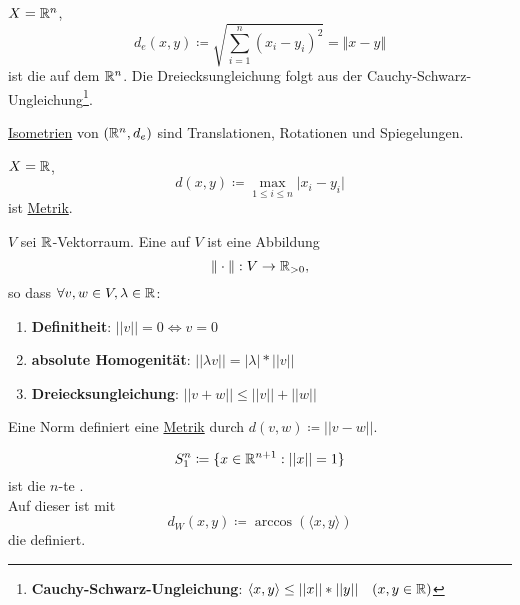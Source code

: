 \begin{example}
  \label{bsp:standardmetrik}
  $ X = \mathbb{R}^n $,
  \begin{equation*}
    d_e(x, y) \coloneqq \sqrt{\sum_{i=1}^n(x_i-y_i)^2} = \Vert x-y \Vert
  \end{equation*}
  ist die  auf dem $ \mathbb{R}^n $. Die Dreiecksungleichung folgt aus der Cauchy-Schwarz-Ungleichung\footnote{\textbf{Cauchy-Schwarz-Ungleichung}: $ \langle x, y \rangle \leq ||x||*||y|| \quad (x, y \in \mathbb{R}) $}.
\end{example}

\begin{remark}[aus LA II]
  \hyperref[def:isometrie]{Isometrien} von $ (\mathbb{R}^n, d_e) $ sind Translationen, Rotationen und Spiegelungen.
\end{remark}

\begin{example}[Maximumsmetrik]
  \label{bsp:maximumsmetrik}
  $ X = \mathbb{R} $,
  \begin{equation*}
    d(x, y) \coloneqq \underset{1 \leq i \leq n}{\max} \vert x_i-y_i \vert
  \end{equation*}
  ist \hyperref[def:metrik]{Metrik}.
\end{example}

\begin{example}
  \label{bsp:norm}
  $ V $ sei $ \mathbb{R} $-Vektorraum. Eine  auf $ V $ ist eine Abbildung 
  \begin{equation*}
    \Vert\cdot\Vert : V \to \mathbb{R}_{>0}\text{,}
  \end{equation*}
  so dass $ \forall v, w \in V, \lambda \in \mathbb{R} $:
  \begin{enumerate}
    \item \textbf{Definitheit}: $ ||v|| = 0 \Leftrightarrow v = 0 $
    \item \textbf{absolute Homogenität}: $ ||\lambda v|| = |\lambda| * ||v|| $
    \item \textbf{Dreiecksungleichung}: $ ||v+w|| \leq ||v||+||w|| $
  \end{enumerate}
  Eine Norm definiert eine \hyperref[def:metrik]{Metrik} durch $ d(v, w) \coloneqq ||v-w|| $.
\end{example}

\begin{example}[Einheitssphäre]
  \label{bsp:einheitssphaere}
  \begin{equation*}
    S_1^n \coloneqq \{ x \in \mathbb{R}^{n+1} : ||x|| = 1 \}
  \end{equation*}
  ist die $ n $-te . \\
  Auf dieser ist mit
  \begin{equation*}
     d_W(x, y) \coloneqq \arccos(\langle x, y \rangle)
  \end{equation*}
  die  definiert.
\end{example}

